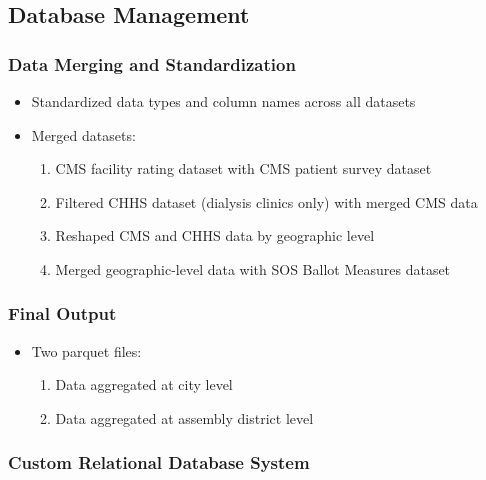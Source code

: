 \documentclass[
  11pt,
  letterpaper,
  DIV=11,
  numbers=noendperiod]{scrartcl}
\providecommand{\tightlist}{%
  \setlength{\itemsep}{0pt}\setlength{\parskip}{0pt}}\usepackage{longtable,booktabs,array}
\begin{document}
\subsection{Database Management}\label{database-management}

\subsubsection{Data Merging and
Standardization}\label{data-merging-and-standardization}

\begin{itemize}
\tightlist
\item
  Standardized data types and column names across all datasets
\item
  Merged datasets:

  \begin{enumerate}
  \def\labelenumi{\arabic{enumi}.}
  \tightlist
  \item
    CMS facility rating dataset with CMS patient survey dataset
  \item
    Filtered CHHS dataset (dialysis clinics only) with merged CMS data
  \item
    Reshaped CMS and CHHS data by geographic level
  \item
    Merged geographic-level data with SOS Ballot Measures dataset
  \end{enumerate}
\end{itemize}

\subsubsection{Final Output}\label{final-output}

\begin{itemize}
\tightlist
\item
  Two parquet files:

  \begin{enumerate}
  \def\labelenumi{\arabic{enumi}.}
  \tightlist
  \item
    Data aggregated at city level
  \item
    Data aggregated at assembly district level
  \end{enumerate}
\end{itemize}

\subsubsection{Custom Relational Database
System}\label{custom-relational-database-system}
\end{document}
